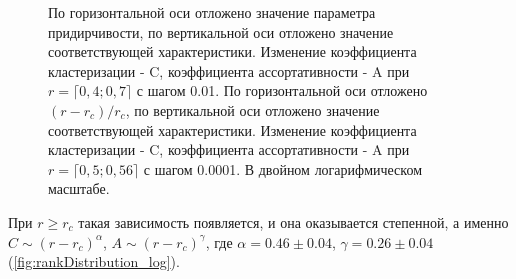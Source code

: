 \documentclass[10pt,aps,pra]{revtex4-1}
\begin{document}
            \begin{figure}[H]  
                \centering

                \caption{
                    \label{fig:baCharacteristic}
                     По горизонтальной оси отложено значение параметра придирчивости, по вертикальной оси отложено значение соответствующей характеристики. Изменение коэффициента кластеризации - C, коэффициента ассортативности - A при $r=\lceil 0,4; 0,7 \rceil$ с шагом 0.01. 
                     По горизонтальной оси отложено $(r-r_c)/r_c$, по вертикальной оси отложено значение соответствующей характеристики. Изменение коэффициента кластеризации - C, коэффициента ассортативности - A при $r=\lceil 0,5; 0,56 \rceil$ с шагом 0.0001. В двойном логарифмическом масштабе.
                }
            \end{figure}

        При $r \geq r_c$ такая зависимость появляется, и она оказывается степенной, а именно $C \sim {(r-r_c)}^\alpha$, $A \sim {(r-r_c)}^\gamma$, где $\alpha = 0.46 \pm 0.04$, $\gamma = 0.26 \pm 0.04$ (\ref{fig:rankDistribution_log}).
\end{document}
